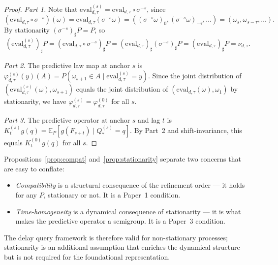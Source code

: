 \begin{proof}
\textit{Part 1.}  Note that
$\mathrm{eval}_{d,\tau}^{(s)} = \mathrm{eval}_{d,\tau} \circ \sigma^{-s}$,
since
\[
  (\mathrm{eval}_{d,\tau} \circ \sigma^{-s})(\omega)
  = \mathrm{eval}_{d,\tau}(\sigma^{-s}\omega)
  = ((\sigma^{-s}\omega)_0, (\sigma^{-s}\omega)_{-\tau}, \ldots)
  = (\omega_s, \omega_{s-\tau}, \ldots).
\]
By stationarity $(\sigma^{-s})_\sharp P = P$, so
\[
  (\mathrm{eval}_{d,\tau}^{(s)})_\sharp P
  = (\mathrm{eval}_{d,\tau} \circ \sigma^{-s})_\sharp P
  = (\mathrm{eval}_{d,\tau})_\sharp (\sigma^{-s})_\sharp P
  = (\mathrm{eval}_{d,\tau})_\sharp P
  = \nu_{d,\tau}.
\]

\textit{Part 2.}  The predictive law map at anchor $s$ is
$\varphi_{d,\tau}^{(s)}(y)(A) = P(\omega_{s+1} \in A \mid
\mathrm{eval}_{d,\tau}^{(s)} = y)$.  Since the joint distribution of
$(\mathrm{eval}_{d,\tau}^{(s)}(\omega), \omega_{s+1})$ equals the joint
distribution of $(\mathrm{eval}_{d,\tau}(\omega), \omega_1)$ by
stationarity, we have $\varphi_{d,\tau}^{(s)} = \varphi_{d,\tau}^{(0)}$
for all $s$.

\textit{Part 3.}  The predictive operator at anchor $s$ and lag $t$ is
$K_t^{(s)} g(q) = \mathbb{E}_P[g(F_{s+t}) \mid Q_*^{(s)} = q]$.  By
Part~2 and shift-invariance, this equals $K_t^{(0)} g(q)$ for all $s$.
\end{proof}

\begin{remark}
Propositions~\ref{prop:compat} and~\ref{prop:stationarity} separate two
concerns that are easy to conflate:
\begin{itemize}
  \item \emph{Compatibility} is a structural consequence of the refinement
    order --- it holds for any $P$, stationary or not.  It is a Paper~1
    condition.
  \item \emph{Time-homogeneity} is a dynamical consequence of stationarity
    --- it is what makes the predictive operator a semigroup.  It is a
    Paper~3 condition.
\end{itemize}
The delay query framework is therefore valid for non-stationary processes;
stationarity is an additional assumption that enriches the dynamical
structure but is not required for the foundational representation.
\end{remark}

